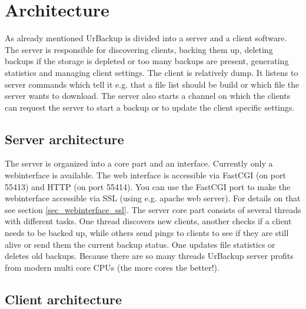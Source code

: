 \documentclass[a4paper,10pt]{article} \usepackage[breaklinks=true]{hyperref}
\begin{document}
\section{Architecture}
\label{sec_architecture}

As already mentioned UrBackup is divided into a server and a client software.
The server is responsible for discovering clients, backing them up, deleting
backups if the storage is depleted or too many backups are present, generating
statistics and managing client settings. The client is relatively dump. It
listens to server commands which tell it e.g. that a file list should be build
or which file the server wants to download. The server also starts a channel on
which the clients can request the server to start a backup or to update the
client specific settings.

\subsection{Server architecture}

The server is organized into a core part and an interface. Currently only a
webinterface is available. The web interface is accessible via FastCGI (on port
55413) and HTTP (on port 55414). You can use the FastCGI port to make the
webinterface accessible via SSL (using e.g. apache web server). For details on
that see section \ref{sec_webinterface_ssl}. The server core part consists of
several threads with different tasks. One thread discovers new clients, another
checks if a client needs to be backed up, while others send pings to clients to
see if they are still alive or send them the current backup status. One updates
file statistics or deletes old backups. Because there are so many threads
UrBackup server profits from modern multi core CPUs (the more cores the
better!).

\subsection{Client architecture}
\end{document}
